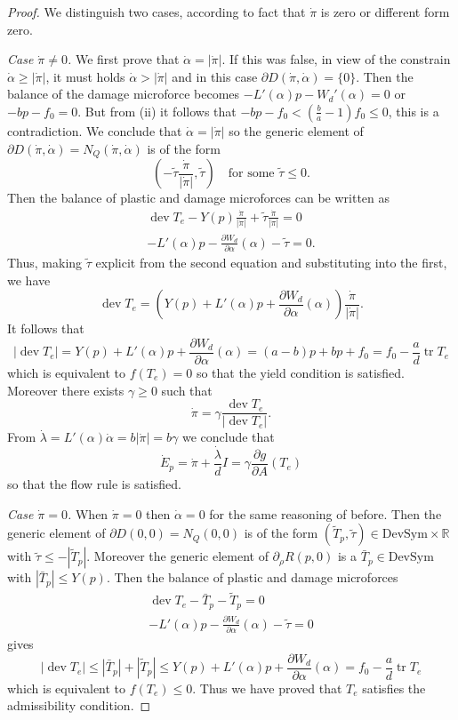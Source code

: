 \documentclass[a4paper,10pt,oneside]{amsbook}
\numberwithin{section}{chapter}
\numberwithin{equation}{chapter}
\theoremstyle{definition}
\DeclareMathOperator{\dev}{dev}
\DeclareMathOperator{\tr}{tr}
\newcommand{\dind}[2]{\frac{\partial #1}{\partial #2}}
\begin{document}
\begin{proof}
We distinguish two cases, according to fact that $\dot\pi$ is zero or different form zero.

\textit{Case $\dot\pi\neq0$.} We first prove that $\dot\alpha=|\dot\pi|$. If this was false, in view of the constrain $\dot\alpha\ge|\dot\pi|$, it must holds $\dot\alpha>|\dot\pi|$ and in this case $\partial D(\dot\pi,\dot\alpha)=\{0\}$. Then the balance of the damage microforce becomes $-L'(\alpha)p-W_d'(\alpha)=0$ or $-bp-f_0=0$. But from (ii) it follows that $-bp-f_0<\left(\frac{b}{a}-1\right)f_0\le0$, this is a contradiction. We conclude that $\dot\alpha=|\dot\pi|$ so the generic element of $\partial D(\dot\pi,\dot\alpha)=N_Q(\dot\pi,\dot\alpha)$ is of the form
\[
\left(-\tilde\tau\frac{\dot\pi}{|\dot\pi|},\tilde\tau\right)\quad\text{for some $\tilde\tau\le0$}.
\]
Then the balance of plastic and damage microforces can be written as
\begin{gather}
\dev T_e-Y(p)\frac{\dot\pi}{|\dot\pi|}+\tilde\tau\frac{\dot\pi}{|\dot\pi|}=0 \\
-L'(\alpha)p-\dind{W_d}{\alpha}(\alpha)-\tilde\tau=0.
\end{gather}
Thus, making $\tilde\tau$ explicit from the second equation and substituting into the first, we have
\[
\dev T_e=\left(Y(p)+L'(\alpha)p+\dind{W_d}{\alpha}(\alpha)\right)\frac{\dot\pi}{|\dot\pi|}.
\]
It follows that
\[
|\dev T_e|=Y(p)+L'(\alpha)p+\dind{W_d}{\alpha}(\alpha)=(a-b)p+bp+f_0=f_0-\frac{a}{d}\tr T_e
\]
which is equivalent to $f(T_e)=0$ so that the yield condition is satisfied. Moreover there exists $\gamma\ge0$ such that
\[
\dot\pi=\gamma\frac{\dev T_e}{|\dev T_e|}.
\]
From $\dot\lambda=L'(\alpha)\dot\alpha=b|\dot\pi|=b\gamma$ we conclude that
\[
\dot E_p=\dot\pi+\frac{\dot\lambda}{d}I=\gamma\dind{g}{A}(T_e)
\]
so that the flow rule is satisfied.

\textit{Case $\dot\pi=0$.} When $\dot\pi=0$ then $\dot\alpha=0$ for the same reasoning of before. Then the generic element of $\partial D(0,0)=N_Q(0,0)$ is of the form $(\tilde T_p,\tilde\tau)\in\text{DevSym}\times\mathbb{R}$ with $\tilde\tau\le-|\tilde T_p|$. Moreover the generic element of $\partial_\rho R(p,0)$ is a $\bar T_p\in\text{DevSym}$ with $|\bar T_p|\le Y(p)$. Then the balance of plastic and damage microforces
\begin{gather}
\dev T_e-\bar T_p-\tilde T_p=0 \\
-L'(\alpha)p-\dind{W_d}{\alpha}(\alpha)-\tilde\tau=0
\end{gather}
gives
\[
|\dev T_e|\le|\bar T_p|+|\tilde T_p|\le Y(p)+L'(\alpha)p+\dind{W_d}{\alpha}(\alpha)=f_0-\frac{a}{d}\tr T_e
\]
which is equivalent to $f(T_e)\le0$. Thus we have proved that $T_e$ satisfies the admissibility condition.
\end{proof}
\end{document}
